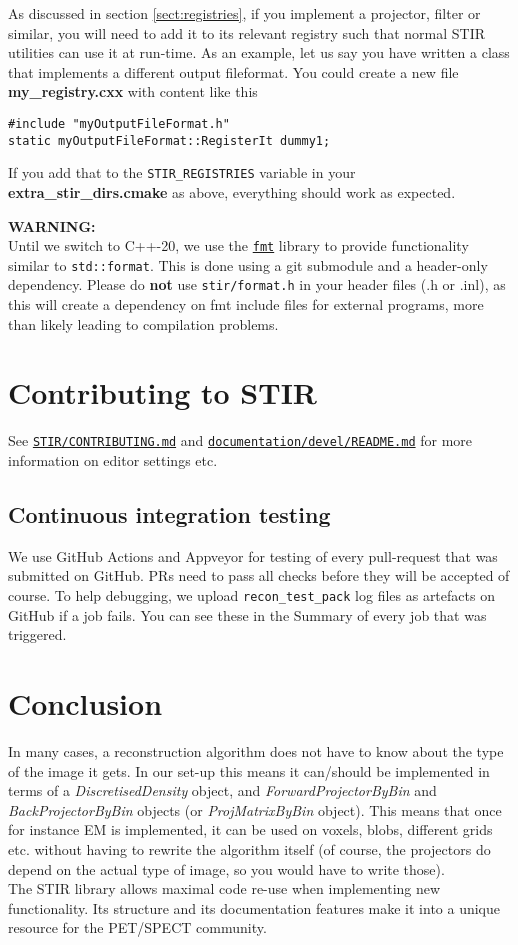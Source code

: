 \documentclass{article}
\def\R2Lurl#1#2{\mbox{\href{#1}{\tt #2}}}
\begin{document}
As discussed in section \ref{sect:registries}, if you implement a projector, filter
or similar, you will need to add it to its relevant registry
such that normal STIR utilities can use it at run-time.
As an example, let us say you have written a class that implements
a different output fileformat. You could create a new file \textbf{my\_registry.cxx} with
content like this
\begin{verbatim}
#include "myOutputFileFormat.h"
static myOutputFileFormat::RegisterIt dummy1;
\end{verbatim}
If you add that to the \texttt{STIR\_REGISTRIES} variable in your \textbf{extra\_stir\_dirs.cmake}
as above, everything should work as expected.

\textbf{WARNING:}\\
Until we switch to C++-20, we use the \R2Lurl{https://github.com/fmtlib/fmt}{fmt} library to
provide functionality similar to \texttt{std::format}. This is done using a git submodule
and a header-only dependency.
Please do \textbf{not} use \texttt{stir/format.h} in your header files (.h or .inl), as this
will create a dependency on fmt include files for external programs, more than likely leading to
compilation problems.

\section{Contributing to STIR}
See
\R2Lurl{https://github.com/UCL/STIR/blob/master/CONTRIBUTING.md}{STIR/CONTRIBUTING.md}
and
\R2Lurl{https://github.com/UCL/STIR/blob/master/documentation/devel/README.md}{documentation/devel/README.md}
for more information on editor settings etc.

\subsection{Continuous integration testing}
We use GitHub Actions and Appveyor for testing of every pull-request that was submitted on GitHub. PRs
need to pass all checks before they will be accepted of course.
To help debugging, we upload \texttt{recon\_test\_pack} log files as artefacts on
GitHub if a job fails. You can see these in the Summary of every job that was triggered.

\section{
Conclusion}

In many cases, a reconstruction algorithm does not have to know 
about the type of the image it gets. In our set-up this means 
it can/should be implemented in terms of a \textit{DiscretisedDensity} 
object, and \textit{ForwardProjectorByBin} and \textit{BackProjectorByBin} 
objects (or \textit{ProjMatrixByBin} object). This means that once 
for instance EM is implemented, it can be used on voxels, blobs, 
different grids etc. without having to rewrite the algorithm 
itself (of course, the projectors do depend on the actual type 
of image, so you would have to write those).\\
The STIR library allows maximal code re-use when implementing 
new functionality. Its structure and its documentation features 
make it into a unique resource for the PET/SPECT community. 
\end{document}
